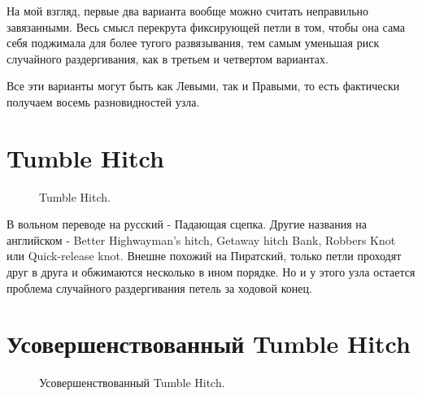 \documentclass{artikel1}
\begin{document}
На мой взгляд, первые два варианта вообще можно считать неправильно завязанными. Весь смысл перекрута фиксирующей петли в том, чтобы она сама себя поджимала для более тугого развязывания, тем самым уменьшая риск случайного раздергивания, как в третьем и четвертом вариантах.

Все эти варианты могут быть как Левыми, так и Правыми, то есть фактически получаем восемь разновидностей узла.

\section{Tumble Hitch}

\begin{figure}[H]\centering
	\subfloat[Завязывание]{\label{ris:Tumble_Hitch_1}
	\tcbox[enhanced jigsaw,colframe=black,opacityframe=0.5,opacityback=0.5,height=6cm]
		{\centering
			}
		}
\hfill
	\subfloat[Завязывание]{\label{ris:Tumble_Hitch_2}
	\tcbox[enhanced jigsaw,colframe=black,opacityframe=0.5,opacityback=0.5,height=6cm]
		{\centering
			}
		}
\hfill
	\subfloat[Результат]{\label{ris:Tumble_Hitch_3}
	\tcbox[enhanced jigsaw,colframe=black,opacityframe=0.5,opacityback=0.5,height=6cm]
		{\centering
			}
		}
	\caption{Tumble Hitch.}\label{ris:Tumble_Hitch}
\end{figure}

В вольном переводе на русский - Падающая сцепка. Другие названия на английском - Better Highwayman's hitch, Getaway hitch Bank, Robbers Knot или Quick-release knot. Внешне похожий на Пиратский, только петли проходят друг в друга и обжимаются несколько в ином порядке. Но и у этого узла остается проблема случайного раздергивания петель за ходовой конец.

\section{Усовершенствованный Tumble Hitch}

\begin{figure}[H]\centering
	\begin{minipage}{1\linewidth}
		\begin{center}
			\tcbox[enhanced jigsaw,colframe=black,opacityframe=0.5,opacityback=0.5]
			{\centering{}}
		\end{center}
	\end{minipage}
\caption{Усовершенствованный Tumble Hitch.}
\label{ris:Tumble_Hitch_var}
\end{figure}
\end{document}
